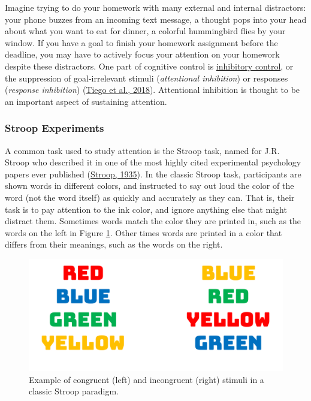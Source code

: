 \documentclass[
]{krantz}
\begin{document}
Imagine trying to do your homework with many external and internal distractors: your phone buzzes from an incoming text message, a thought pops into your head about what you want to eat for dinner, a colorful hummingbird flies by your window. If you have a goal to finish your homework assignment before the deadline, you may have to actively focus your attention on your homework despite these distractors. One part of cognitive control is \protect\hyperlink{inhibitory-control}{inhibitory control}, or the suppression of goal-irrelevant stimuli (\emph{attentional inhibition}) or responses (\emph{response inhibition}) (\protect\hyperlink{ref-Tiego2018}{Tiego et al., 2018}). Attentional inhibition is thought to be an important aspect of sustaining attention.

\hypertarget{stroop-experiments}{%
\subsubsection*{Stroop Experiments}\label{stroop-experiments}}


A common task used to study attention is the Stroop task, named for J.R. Stroop who described it in one of the most highly cited experimental psychology papers ever published (\protect\hyperlink{ref-Stroop1935}{Stroop, 1935}). In the classic Stroop task, participants are shown words in different colors, and instructed to say out loud the color of the word (not the word itself) as quickly and accurately as they can. That is, their task is to pay attention to the ink color, and ignore anything else that might distract them. Sometimes words match the color they are printed in, such as the words on the left in Figure \ref{fig:stroop}. Other times words are printed in a color that differs from their meanings, such as the words on the right.

\begin{figure}

{\centering \includegraphics[width=0.6\linewidth]{images/ch3/stroop} 

}

\caption{Example of congruent (left) and incongruent (right) stimuli in a classic Stroop paradigm.}\label{fig:stroop}
\end{figure}
\end{document}
